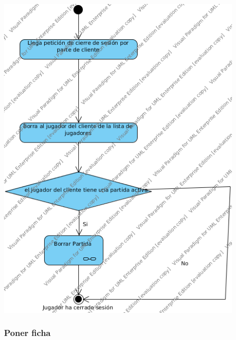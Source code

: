 \documentclass[a4paper,11pt,oneside]{article}
\begin{document}
\includegraphics[width=0.9\textwidth]{img/ms_CerrarSesionServidor.png}\\[1cm]

\subsubsection{Poner ficha}
\end{document}
